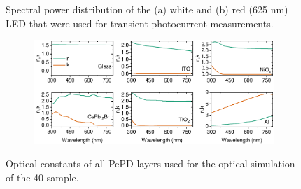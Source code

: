 \begin{figure}[ht!=]
    \caption[Spectral power distribution of the white and red (625 nm) LED that were used for transient photocurrent measurements.]{Spectral power distribution of the (a) white and (b) red (625 nm) LED that were used for transient photocurrent measurements.}
    \label{fig:etl_opt:tpc_sources}
\end{figure}



\begin{figure}[htbp]
    \centering
    \begin{subfigure}[t]{0.99\textwidth}
        \centering
        \includegraphics[width=\textwidth]{chapters/transport_layers/images/nk_transfer_matrix.pdf} %
                
    \end{subfigure}
    \caption[Optical constants of all PePD layers used for the optical simulation of the 40 sample.]{Optical constants of all PePD layers used for the optical simulation of the 40 sample.}
    \label{fig:tetl_opt:nk_transfer_materix}
\end{figure}


